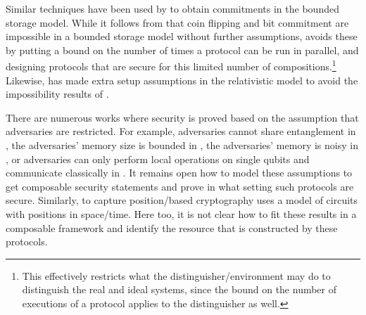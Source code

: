 Similar techniques have been used by \textcite{Unr11} to obtain
commitments in the bounded storage model. While it follows from
\textcite{VPdR19} that coin flipping and bit commitment are impossible
in a bounded storage model without further assumptions,
\textcite{Unr11} avoids these by putting a bound on the number of
times a protocol can be run in parallel, and designing protocols that
are secure for this limited number of compositions.\footnote{This
  effectively restricts what the distinguisher/environment may do to
  distinguish the real and ideal systems, since the bound on the
  number of executions of a protocol applies to the distinguisher as
  well.} Likewise, \textcite{Pro20} has made extra setup assumptions
in the relativistic model to avoid the impossibility results of
\textcite{VPdR19}.
  
  There are numerous works where security is proved based on the assumption that adversaries are restricted. For example, adversaries cannot share entanglement in
\textcite{BCFGGOS14}, the adversaries' memory size is bounded in
\textcite{DFSS07,DFSS08}, the adversaries' memory is noisy in
\textcite{WST08,STW09,KWW12}, or adversaries can only perform local
operations on single qubits and communicate classically in
\textcite{Liu14,Liu15}. It remains open how to model these assumptions
to get composable security statements and prove in what setting such
protocols are secure. Similarly, to capture position\-/based
cryptography \textcite{Unr14} uses a model of circuits with positions in
space\-/time. Here too, it is not clear how to fit these results in a
composable framework and identify the resource that is constructed by these
protocols.


